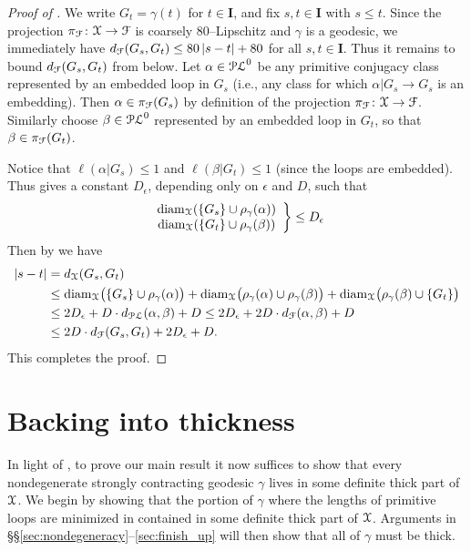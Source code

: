 \documentclass[letterpaper,fleqn]{article}
\theoremstyle{plain}
\theoremstyle{definition}
\DeclareMathOperator{\diam}{diam}
\newcommand{\abs}[1]{\left\vert#1\right\vert}
\newcommand{\factor}{{\EuScript F}} %
\newcommand{\fc}{\factor} %
\newcommand{\pl}{{\EuScript{PL}}} %
\newcommand{\os}{{\EuScript X}} %
\newcommand{\X}{\os}
\newcommand{\fproj}{\pi_\fc} %
\newcommand{\minlen}{m}  %
\newcommand{\minpts}{\rho} %
\renewcommand{\diam}{\mathrm{diam}}
\newcommand{\I}{\mathbf{I}}
\begin{document}
\begin{proof}[Proof of ]
We write $G_t = \gamma(t)$ for $t\in \I$, and fix $s,t\in \I$ with $s\le t$. Since the projection $\fproj\colon \os\to \fc$ is coarsely $80$--Lipschitz \cite[Lemma 2.9]{DT1} and $\gamma$ is a geodesic, we immediately have $d_\fc(G_s,G_t)\le 80\abs{s-t} + 80$ for all $s,t\in \I$. Thus it remains to bound $d_\fc(G_s,G_t)$ from below. Let $\alpha\in \pl^0$ be any primitive conjugacy class represented by an embedded loop in $G_s$ (i.e., any class for which $\alpha\vert G_s \to G_s$ is an embedding). Then $\alpha\in \fproj(G_s)$ by definition of the projection $\fproj\colon \os\to\fc$. Similarly choose $\beta\in \pl^0$ represented by an embedded loop in $G_t$, so that $\beta\in \fproj(G_t)$.

Notice that $\ell(\alpha\vert G_s)\le 1$ and $\ell(\beta\vert G_t) \le 1$ (since the loops are embedded). Thus  gives a constant $D_{\epsilon}$, depending only on $\epsilon$ and $D$, such that 
\begin{equation*}
\left.\begin{array}{c} \mathrm{diam}_{\X}(\{G_s\} \cup \minpts_\gamma(\alpha)) \\  \mathrm{diam}_{\X}(\{G_t\}\cup \minpts_\gamma(\beta)) 
\end{array}\right\}\le D_\epsilon
\end{equation*}
Then by  we have
\begin{align*}
|s-t| &= d_{\X}(G_s,G_t) \\
&\le \diam_{\X}\big(\{G_s\} \cup  \minpts_\gamma(\alpha)\big) + \diam_{\X}\big(\minpts_\gamma(\alpha) \cup \minpts_\gamma(\beta)\big) + \diam_{\X}\big(\minpts_\gamma(\beta) \cup \{G_t\}\big) \\
&\le 2D_{\epsilon} + D \cdot d_{\pl}(\alpha,\beta) +D \le 2D_{\epsilon} + 2D \cdot d_{\fc}(\alpha,\beta) +D \\
&\le 2D \cdot d_{\fc}(G_s,G_t) + 2D_\epsilon +D.
\end{align*}
This completes the proof.
\end{proof}

\section{Backing into thickness}
\label{sec:backing_up}

In light of , to prove our main result  it now suffices to show that every nondegenerate strongly contracting geodesic $\gamma$ lives in some definite thick part of $\os$.
We begin by showing that the portion of $\gamma$ where the lengths of primitive loops are minimized in contained in some definite thick part of $\X$. Arguments in \S\S\ref{sec:nondegeneracy}--\ref{sec:finish_up} will then show that all of $\gamma$ must be thick. 
\end{document}
